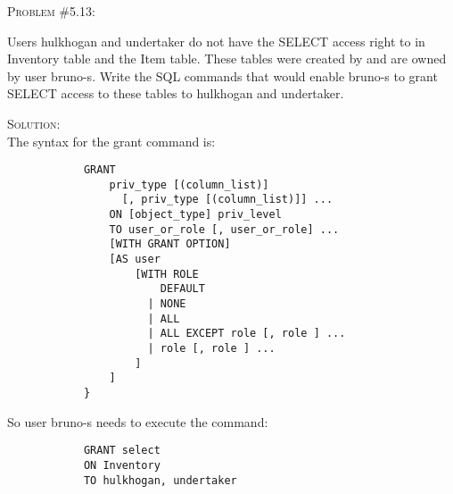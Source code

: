 \documentclass[12pt]{article}
\newenvironment{problem}[1]
{\begin{mdframed}[linewidth=0.8pt]
        \textsc{Problem #1:}

}
    {\end{mdframed}}
\newenvironment{solution}
    {\textsc{Solution:}\\}
    {\newpage}%
\begin{document}
	\begin{problem}{\#5.13}
		Users hulkhogan and undertaker do not have the SELECT access right to in Inventory
		table and the Item table. These tables were created by and are owned by user bruno-s.
		Write the SQL commands that would enable bruno-s to grant SELECT access to these tables
		to hulkhogan and undertaker.
	\end{problem}
	\begin{solution}
		The syntax for the grant command is:
		\begin{verbatim}
			GRANT
    			priv_type [(column_list)]
    			  [, priv_type [(column_list)]] ...
    			ON [object_type] priv_level
    			TO user_or_role [, user_or_role] ...
    			[WITH GRANT OPTION]
    			[AS user
    			    [WITH ROLE
    			        DEFAULT
    			      | NONE
    			      | ALL
    			      | ALL EXCEPT role [, role ] ...
    			      | role [, role ] ...
    			    ]
    			]
			}
		\end{verbatim}
		So user bruno-s needs to execute the command:
		\begin{verbatim}
			GRANT select
			ON Inventory
			TO hulkhogan, undertaker
		\end{verbatim}
	\end{solution}
\end{document}
